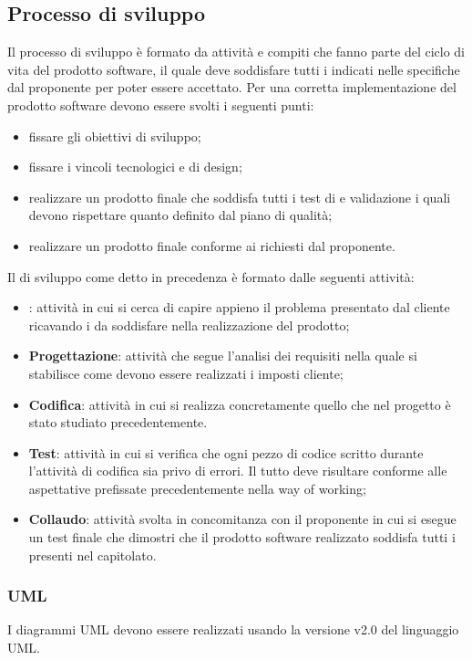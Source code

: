 \subsection{Processo di sviluppo}
Il processo di sviluppo è formato da attività e compiti che fanno parte del ciclo di vita del prodotto software, il quale deve soddisfare tutti i  indicati nelle specifiche dal proponente per poter essere accettato.
Per una corretta implementazione del prodotto software devono essere svolti i seguenti punti: 
\begin{itemize}
	\item fissare gli obiettivi di sviluppo;
	\item fissare i vincoli tecnologici e di design;
	\item realizzare un prodotto finale che soddisfa tutti i test di  e validazione i quali devono rispettare quanto definito dal piano di qualità;
	\item realizzare un prodotto finale conforme ai  richiesti dal proponente.
\end{itemize}		
Il  di sviluppo come detto in precedenza è formato dalle seguenti attività:
\begin{itemize}
	\item \textbf{\AdR{}}: attività in cui si cerca di capire appieno il problema presentato dal cliente ricavando i  da soddisfare nella realizzazione del prodotto;
	\item \textbf{Progettazione}: attività che segue l'analisi dei requisiti nella quale si stabilisce come devono essere realizzati i  imposti cliente;
	\item \textbf{Codifica}: attività in cui si realizza concretamente quello che nel progetto è stato  studiato precedentemente.
	\item \textbf{Test}: attività in cui si verifica che ogni pezzo di codice scritto durante l'attività di codifica sia privo di errori. Il tutto deve risultare conforme alle aspettative prefissate precedentemente nella way of working;
\item \textbf{Collaudo}: attività svolta in concomitanza con il proponente in cui si esegue un test finale che dimostri che il prodotto software realizzato soddisfa tutti i  presenti nel capitolato.
\end{itemize}


\subsubsection{UML}
I diagrammi UML devono essere realizzati usando la versione v2.0 del linguaggio UML.





